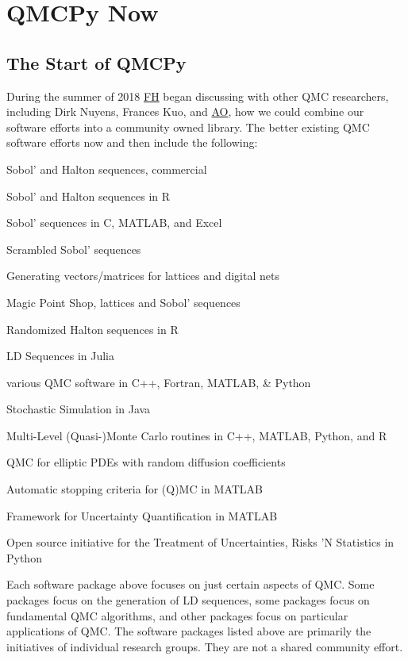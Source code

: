 \documentclass[11pt]{NSFamsart}
\newcommand{\FH}{\hyperlink{FHlink}{FH}\xspace}
\newcommand{\AO}{\hyperlink{AOlink}{AO}\xspace}
\begin{document}
\section{QMCPy Now}

\subsection{The Start of QMCPy}
During the summer of 2018 \FH began discussing with other QMC researchers, including Dirk Nuyens, Frances Kuo, and \AO, how we could combine our software efforts into a community owned library.  The better existing QMC software efforts now and then include the following:
\begin{description}[format=\textup]
	\item[MATLAB] Sobol' and Halton sequences, commercial \cite{MAT9.8}
	\item [qrng]  Sobol' and Halton sequences in R \cite{QRNG2020}
	\item[BRODA] Sobol' sequences in C, MATLAB, and Excel \cite{BRODA20a}
	\item[PyTorch] Scrambled Sobol' sequences \cite{PyTorch}
	\item[LatNet Builder] Generating vectors/matrices for lattices and digital nets \cite{LatNet}
	\item[MPS] Magic Point Shop, lattices and Sobol' sequences \cite{Nuy17a}
	\item[Owen] Randomized Halton sequences in R \cite{Owe20a}
	\item[Robbe] LD Sequences in Julia \cite{Rob20a}
	\item[Burkhardt] various QMC software in C++, Fortran, MATLAB, \& Python \cite{Bur20a}
	\item[SSJ] Stochastic Simulation in Java \cite{SSJ}
	\item[ML(Q)MC] Multi-Level (Quasi-)Monte Carlo routines in C++, MATLAB, Python, and R \cite{GilesSoft}
	\item[QMC4PDE] QMC for elliptic PDEs with random diffusion coefficients \cite{KuoNuy16a}
	\item[GAIL] Automatic stopping criteria for (Q)MC in MATLAB \cite{ChoEtal20a}
	\item[UQLab] Framework for Uncertainty Quantification in MATLAB \cite{UQLab2014}
	\item[OpenTURNS] Open source initiative for the Treatment of Uncertainties, Risks 'N Statistics in Python \cite{OpenTURNS}
\end{description}
Each software package above  focuses on just certain aspects of QMC.  Some packages focus on the generation of LD sequences, some packages focus on fundamental QMC algorithms, and other packages focus on particular applications of QMC.  The software packages listed above are primarily the initiatives of individual research groups.  They are not a shared community effort.
\end{document}

